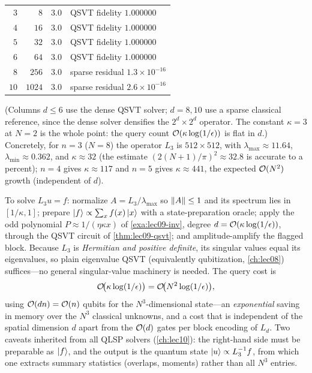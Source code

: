 \begin{example}
\begin{center}
\begin{tabular}{r r r l}
\midrule
$3$  & $8$    & $3.0$ & QSVT fidelity $1.000000$\\
$4$  & $16$   & $3.0$ & QSVT fidelity $1.000000$\\
$5$  & $32$   & $3.0$ & QSVT fidelity $1.000000$\\
$6$  & $64$   & $3.0$ & QSVT fidelity $1.000000$\\
$8$  & $256$  & $3.0$ & sparse residual $1.3\times10^{-16}$\\
$10$ & $1024$ & $3.0$ & sparse residual $2.6\times10^{-16}$\\
\bottomrule
\end{tabular}
\end{center}
(Columns $d\le6$ use the dense QSVT solver; $d=8,10$ use a sparse classical reference,
since the dense solver densifies the $2^d\times2^d$ operator. The constant $\kappa=3$
at $N=2$ is the whole point: the query count $\mathcal{O}(\kappa\log(1/\epsilon))$ is flat in
$d$.)
Concretely, for $n=3$ ($N=8$) the operator $L_3$ is $512\times512$, with
$\lambda_{\max}\approx11.64$, $\lambda_{\min}\approx0.362$, and $\kappa\approx32$ (the
estimate $(2(N{+}1)/\pi)^2\approx32.8$ is accurate to a percent); $n=4$ gives
$\kappa\approx117$ and $n=5$ gives $\kappa\approx441$, the expected $\mathcal{O}(N^2)$ growth
(independent of $d$).

To solve $L_3 u=f$: normalize $A=L_3/\lambda_{\max}$ so $\left\lVert A \right\rVert\le1$ and its spectrum
lies in $[1/\kappa,1]$; prepare $\ket f\propto\sum_x f(x)\ket x$ with a state-preparation
oracle; apply the odd polynomial $P\approx 1/(\eta\kappa x)$ of \cref{exa:lec09-inv},
degree $d=\mathcal{O}(\kappa\log(1/\epsilon))$, through the QSVT circuit of
\cref{thm:lec09-qsvt}; and amplitude-amplify the flagged block. Because $L_3$ is
\emph{Hermitian and positive definite}, its singular values equal its eigenvalues, so
plain eigenvalue QSVT (equivalently qubitization, \cref{ch:lec08}) suffices---no general
singular-value machinery is needed. The query cost is
\[
  \mathcal{O}\!\bigl(\kappa\log(1/\epsilon)\bigr)=\mathcal{O}\!\bigl(N^2\log(1/\epsilon)\bigr),
\]
using $\mathcal{O}(dn)=\mathcal{O}(n)$ qubits for the $N^3$-dimensional state---an
\emph{exponential} saving in memory over the $N^3$ classical unknowns, and a cost that
is independent of the spatial dimension $d$ apart from the $\mathcal{O}(d)$ gates per block
encoding of $L_d$. Two caveats inherited from all QLSP solvers (\cref{ch:lec10}): the
right-hand side must be preparable as $\ket f$, and the output is the quantum state
$\ket u\propto L_3^{-1}f$, from which one extracts summary statistics (overlaps, moments)
rather than all $N^3$ entries.


\end{example}
